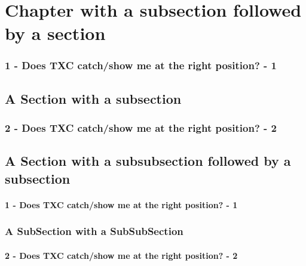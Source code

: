 %

%
%
%
%


\chapter{Chapter with a subsection followed by a section}

\subsection{1 - Does TXC catch/show me at the right position? - 1}

\section{A Section with a subsection}

\subsection{2 - Does TXC catch/show me at the right position? - 2}



\section{A Section with a subsubsection followed by a subsection}

\subsubsection{1 - Does TXC catch/show me at the right position? - 1}

\subsection{A SubSection with a SubSubSection}

\subsubsection{2 - Does TXC catch/show me at the right position? - 2}

